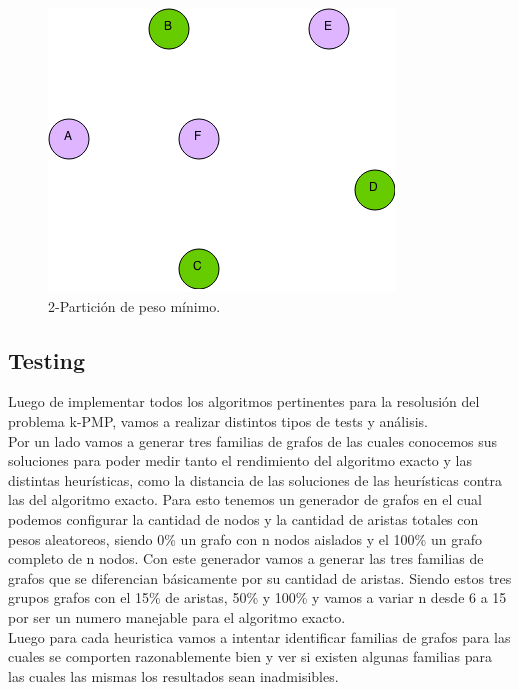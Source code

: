 \begin{figure}[H]
\begin{center}
\includegraphics[scale=0.7]{img/kpmp2.png}
\caption{2-Partici\'on de peso m\'inimo.}
\end{center}
\end{figure}


\subsection{Testing}

Luego de implementar todos los algoritmos pertinentes para la resolusión del problema k-PMP, vamos a realizar distintos tipos de tests y análisis.\\

Por un lado vamos a generar tres familias de grafos de las cuales conocemos sus soluciones para poder medir tanto el rendimiento del algoritmo exacto y las distintas heurísticas, como la distancia de las soluciones de las heurísticas contra las del algoritmo exacto. Para esto tenemos un generador de grafos en el cual podemos configurar la cantidad de nodos y la cantidad de aristas totales con pesos aleatoreos, siendo 0\% un grafo con n nodos aislados y el 100\% un grafo completo de n nodos. Con este generador vamos a generar las tres familias de grafos que se diferencian básicamente por su cantidad de aristas. Siendo estos tres grupos grafos con el 15\% de aristas, 50\% y 100\% y vamos a variar n desde 6 a 15 por ser un numero manejable para el algoritmo exacto.\\

Luego para cada heuristica vamos a intentar identificar familias de grafos para las cuales se comporten razonablemente bien y ver si existen algunas familias para las cuales las mismas los resultados sean inadmisibles.